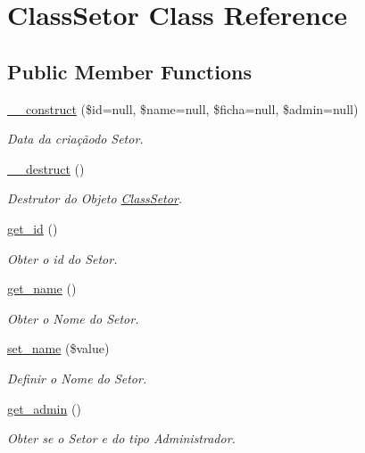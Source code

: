 \hypertarget{class_class_setor}{}\section{Class\+Setor Class Reference}
\label{class_class_setor}
\subsection*{Public Member Functions}
\begin{DoxyCompactItemize}
\item 
\hyperlink{class_class_setor_ad06a6c4ff80af97f706cf13d4e472b4f}{\+\_\+\+\_\+construct} (\$id=null, \$name=null, \$ficha=null, \$admin=null)
\begin{DoxyCompactList}\small\item\em Data da criaçãodo Setor. \end{DoxyCompactList}\item 
\hyperlink{class_class_setor_a421831a265621325e1fdd19aace0c758}{\+\_\+\+\_\+destruct} ()
\begin{DoxyCompactList}\small\item\em Destrutor do Objeto \hyperlink{class_class_setor}{Class\+Setor}. \end{DoxyCompactList}\item 
\hyperlink{class_class_setor_a8a94003b9d888b085c68d6eac44be175}{get\+\_\+id} ()
\begin{DoxyCompactList}\small\item\em Obter o id do Setor. \end{DoxyCompactList}\item 
\hyperlink{class_class_setor_a4f1149ccbd69d1ac4225b7bc2dd871bb}{get\+\_\+name} ()
\begin{DoxyCompactList}\small\item\em Obter o Nome do Setor. \end{DoxyCompactList}\item 
\hyperlink{class_class_setor_a53e29da8f1da63502f3e13091fcb74e5}{set\+\_\+name} (\$value)
\begin{DoxyCompactList}\small\item\em Definir o Nome do Setor. \end{DoxyCompactList}\item 
\hyperlink{class_class_setor_aae367241584b2f61c523f167cbafee01}{get\+\_\+admin} ()
\begin{DoxyCompactList}\small\item\em Obter se o Setor e do tipo Administrador. \end{DoxyCompactList}\item 

\end{DoxyCompactItemize}
